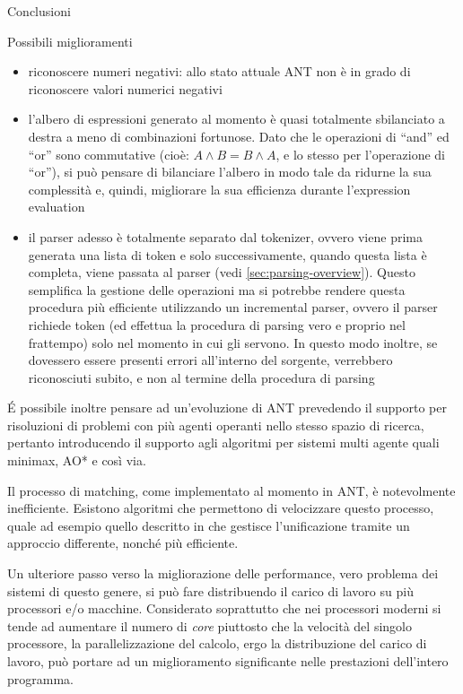\begin{chapter}{Conclusioni}
\begin{section}{Possibili miglioramenti}
\begin{itemize}
	\item riconoscere numeri negativi: allo stato attuale ANT non \`e in grado
	      di riconoscere valori numerici negativi
	\item l'albero di espressioni generato al momento %
	      \`e quasi totalmente sbilanciato a destra a meno di combinazioni
				fortunose. Dato che le operazioni di ``and'' ed ``or'' sono commutative
				(cio\`e: $A \wedge B = B \wedge A$, e lo stesso per l'operazione di ``or''),
				si pu\`o pensare di bilanciare l'albero in modo tale da ridurne la sua
				complessit\`a e, quindi, migliorare la sua efficienza durante l'expression
				evaluation
	\item il parser adesso \`e totalmente separato dal tokenizer, ovvero viene
	      prima generata una lista di token e solo successivamente, quando questa
				lista \`e completa, viene passata al parser (vedi \ref{sec:parsing-overview}).
				Questo semplifica la gestione delle operazioni ma si potrebbe rendere
				questa procedura pi\`u efficiente utilizzando un incremental parser,
				ovvero il parser richiede token (ed effettua la procedura di parsing
				vero e proprio nel frattempo) solo nel momento in cui gli servono. In questo
				modo inoltre, se dovessero essere presenti errori all'interno del sorgente,
				verrebbero riconosciuti subito, e non al termine della procedura di
				parsing
\end{itemize}

\'E possibile inoltre pensare ad un'evoluzione di ANT prevedendo il supporto per
risoluzioni di problemi con pi\`u agenti operanti nello stesso spazio di ricerca, pertanto
introducendo il supporto agli algoritmi per sistemi multi agente quali minimax, AO* e
cos\`i via.

Il processo di matching, come implementato al momento in ANT, \`e notevolmente
inefficiente. Esistono algoritmi che permettono di velocizzare questo processo,
quale ad esempio quello descritto in \cite{357169} che gestisce l'unificazione
tramite un approccio differente, nonch\'e pi\`u efficiente.

Un ulteriore passo verso la migliorazione delle performance, vero problema
dei sistemi di questo genere, si pu\`o fare distribuendo il carico di lavoro su
pi\`u processori e/o macchine. Considerato soprattutto che nei processori moderni si
tende ad aumentare il numero di \textit{core} piuttosto che la velocit\`a del
singolo processore, la parallelizzazione del calcolo, ergo la distribuzione del
carico di lavoro, pu\`o portare ad un miglioramento significante nelle prestazioni
dell'intero programma.


\end{section}
\end{chapter}

